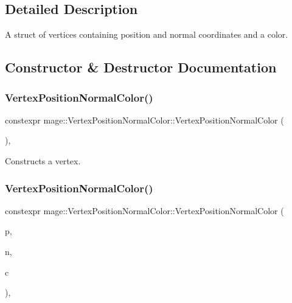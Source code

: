 \subsection{Detailed Description}
A struct of vertices containing position and normal coordinates and a color. 

\subsection{Constructor \& Destructor Documentation}
\hypertarget{structmage_1_1_vertex_position_normal_color_a427387ac9b0e28c85c03eeab1796ae09}{}\label{structmage_1_1_vertex_position_normal_color_a427387ac9b0e28c85c03eeab1796ae09} 
\subsubsection{\texorpdfstring{Vertex\+Position\+Normal\+Color()}{VertexPositionNormalColor()}\hspace{0.1cm}{\footnotesize\ttfamily [1/4]}}
{\footnotesize\ttfamily constexpr mage\+::\+Vertex\+Position\+Normal\+Color\+::\+Vertex\+Position\+Normal\+Color (\begin{DoxyParamCaption}{ }\end{DoxyParamCaption})\hspace{0.3cm}{\ttfamily [default]}, {\ttfamily [noexcept]}}

Constructs a vertex. \hypertarget{structmage_1_1_vertex_position_normal_color_a5098d027d69c0454b2754411614e181b}{}\label{structmage_1_1_vertex_position_normal_color_a5098d027d69c0454b2754411614e181b} 
\subsubsection{\texorpdfstring{Vertex\+Position\+Normal\+Color()}{VertexPositionNormalColor()}\hspace{0.1cm}{\footnotesize\ttfamily [2/4]}}
{\footnotesize\ttfamily constexpr mage\+::\+Vertex\+Position\+Normal\+Color\+::\+Vertex\+Position\+Normal\+Color (\begin{DoxyParamCaption}\item[{const \hyperlink{structmage_1_1_point3}{Point3} \&}]{p,  }\item[{const \hyperlink{structmage_1_1_normal3}{Normal3} \&}]{n,  }\item[{const \hyperlink{structmage_1_1_s_r_g_b_a}{S\+R\+G\+BA} \&}]{c }\end{DoxyParamCaption})\hspace{0.3cm}{\ttfamily [explicit]}, {\ttfamily [noexcept]}}

